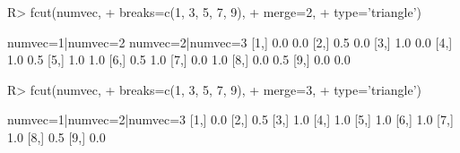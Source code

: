 \begin{Schunk}
% --begin: "fcut.merge"
\begin{Sinput}
R> fcut(numvec,
+       breaks=c(1, 3, 5, 7, 9),
+       merge=2,
+       type='triangle')
\end{Sinput}
\begin{Soutput}
      numvec=1|numvec=2 numvec=2|numvec=3
 [1,]               0.0               0.0
 [2,]               0.5               0.0
 [3,]               1.0               0.0
 [4,]               1.0               0.5
 [5,]               1.0               1.0
 [6,]               0.5               1.0
 [7,]               0.0               1.0
 [8,]               0.0               0.5
 [9,]               0.0               0.0
\end{Soutput}
\begin{Sinput}
R> fcut(numvec,
+       breaks=c(1, 3, 5, 7, 9),
+       merge=3,
+       type='triangle')
\end{Sinput}
\begin{Soutput}
      numvec=1|numvec=2|numvec=3
 [1,]                        0.0
 [2,]                        0.5
 [3,]                        1.0
 [4,]                        1.0
 [5,]                        1.0
 [6,]                        1.0
 [7,]                        1.0
 [8,]                        0.5
 [9,]                        0.0
\end{Soutput}
%
% --end: "fcut.merge"
\end{Schunk}
